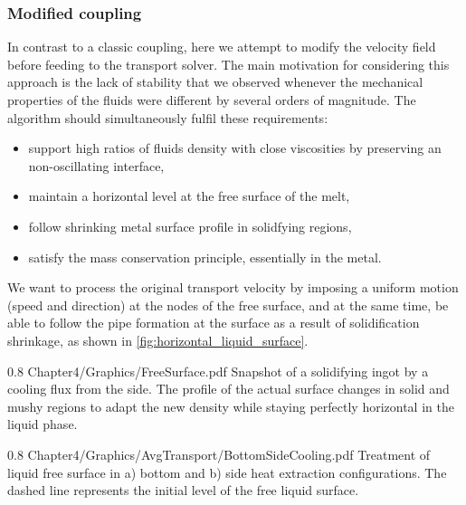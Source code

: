 \subsubsection{Modified coupling}
In contrast to a classic coupling, here we attempt to modify the velocity field before feeding to the transport solver.
The main motivation for considering this approach is the lack of stability that we observed whenever the mechanical
properties of the fluids were different by several orders of magnitude.
The algorithm should simultaneously fulfil these requirements: 
\begin{itemize}
\itemsep0em
\item support high ratios of fluids density with close viscosities by preserving an non-oscillating interface,
\item maintain a horizontal level at the free surface of the melt,
\item follow shrinking metal surface profile in solidfying regions,
\item satisfy the mass conservation principle, essentially in the metal.
\end{itemize}
We want to process the original transport velocity by imposing a uniform motion (speed and direction) 
at the nodes of the free surface, and at the same time, be able to follow the pipe formation at the 
surface as a result of solidification shrinkage, as shown in \cref{fig:horizontal_liquid_surface}.
\begin{figureth}
{0.8}
{Chapter4/Graphics/FreeSurface.pdf}
{Snapshot of a solidifying ingot by a cooling flux from the side. The profile of the actual surface changes in solid and mushy regions
to adapt the new density while staying perfectly horizontal in the liquid phase.}
\label{fig:horizontal_liquid_surface}
\end{figureth}
%
%
\begin{figureth}
{0.8}
{Chapter4/Graphics/AvgTransport/BottomSideCooling.pdf}
{Treatment of liquid free surface in a) bottom and b) side heat extraction configurations. The dashed line represents the 
initial level of the free liquid surface.}
\label{fig:bottom_side_cooling}
\end{figureth}
